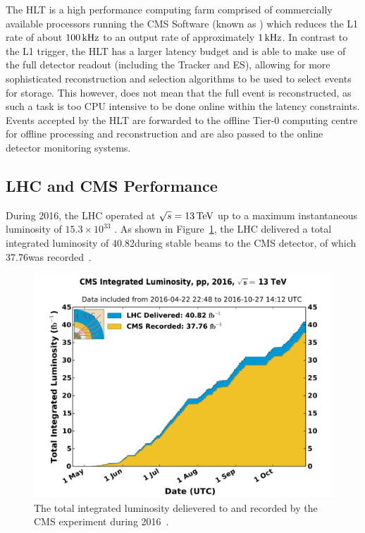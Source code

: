The HLT is a high performance computing farm comprised of commercially available processors running the CMS Software (known as \CMSSW) which reduces the L1 rate of about $100\text{\,kHz}$ to an output rate of approximately $1\text{\,kHz}$.
In contrast to the L1 trigger, the HLT has a larger latency budget and is able to make use of the full detector readout (including the Tracker and ES), allowing for more sophisticated reconstruction and selection algorithms to be used to select events for storage.
This however, does not mean that the full event is reconstructed, as such a task is too CPU intensive to be done online within the latency constraints.
Events accepted by the HLT are forwarded to the offline Tier-0 computing centre for offline processing and reconstruction and are also passed to the online detector monitoring systems.

\subsection{LHC and CMS Performance}\label{subsec:Lumi}
During 2016, the LHC operated at $\sqrt{s} = 13\,\text{Te\hspace{-.08em}V}$ up to a maximum instantaneous luminosity of $15.3 \times 10^{33}$ \percms.
As shown in Figure~\ref{fig:cms_lumi}, the LHC delivered a total integrated luminosity of 40.82\fbinv during stable beams to the CMS detector, of which 37.76\fbinv was recorded~\cite{cmsLumiPage,CMS:2017_lumi}.
\begin{figure}[htbp]
\begin{center}
\includegraphics[width=1.05\textwidth]{figs/lhc/int_lumi_per_day_cumulative_pp_2016.pdf}
\caption{The total integrated luminosity delievered to and recorded by the CMS experiment during 2016~\cite{CMS:2017_lumi}.}
\label{fig:cms_lumi}
\end{center}
\end{figure}


